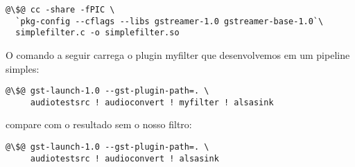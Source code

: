 \begin{lstlisting}[style=command]
@\$@ cc -share -fPIC \
  `pkg-config --cflags --libs gstreamer-1.0 gstreamer-base-1.0`\
  simplefilter.c -o simplefilter.so
\end{lstlisting}

O comando a seguir carrega o plugin myfilter que desenvolvemos em um pipeline
simples:

\begin{lstlisting}[style=command]
@\$@ gst-launch-1.0 --gst-plugin-path=. \
     audiotestsrc ! audioconvert ! myfilter ! alsasink
\end{lstlisting}

\noindent compare com o resultado sem o nosso filtro:
\begin{lstlisting}[style=command]
@\$@ gst-launch-1.0 --gst-plugin-path=. \
     audiotestsrc ! audioconvert ! alsasink
\end{lstlisting}


